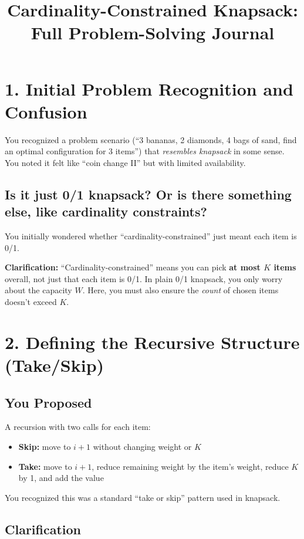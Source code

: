\documentclass[12pt]{article}
\title{Cardinality-Constrained Knapsack: Full Problem-Solving Journal}
\author{}
\date{}
\begin{document}
\maketitle

\section*{1. Initial Problem Recognition and Confusion}

You recognized a problem scenario (“3 bananas, 2 diamonds, 4 bags of sand, find an optimal configuration for 3 items”) that \textit{resembles knapsack} in some sense. You noted it felt like “coin change II” but with limited availability.

\subsection*{Is it just 0/1 knapsack? Or is there something else, like cardinality constraints?}

You initially wondered whether “cardinality-constrained” just meant each item is 0/1.

\textbf{Clarification:} “Cardinality-constrained” means you can pick \textbf{at most $K$ items} overall, not just that each item is 0/1. In plain 0/1 knapsack, you only worry about the capacity $W$. Here, you must also ensure the \textit{count} of chosen items doesn’t exceed $K$.

\section*{2. Defining the Recursive Structure (Take/Skip)}

\subsection*{You Proposed}

A recursion with two calls for each item:
\begin{itemize}
  \item \textbf{Skip:} move to $i+1$ without changing weight or $K$
  \item \textbf{Take:} move to $i+1$, reduce remaining weight by the item’s weight, reduce $K$ by 1, and add the value
\end{itemize}

You recognized this was a standard “take or skip” pattern used in knapsack.

\subsection*{Clarification}
\end{document}
